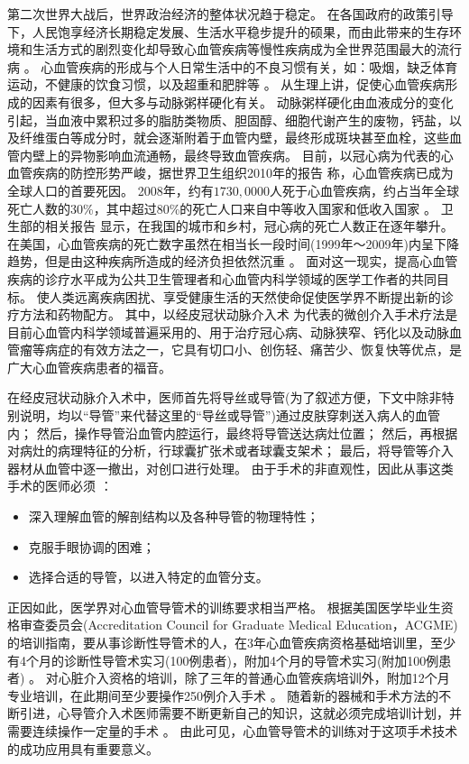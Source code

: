 第二次世界大战后，世界政治经济的整体状况趋于稳定。
在各国政府的政策引导下，人民饱享经济长期稳定发展、生活水平稳步提升的硕果，而由此带来的生存环境和生活方式的剧烈变化却导致心血管疾病等慢性疾病成为全世界范围最大的流行病 \cite{Hu2009}。%
心血管疾病的形成与个人日常生活中的不良习惯有关，如：吸烟，缺乏体育运动，不健康的饮食习惯，以及超重和肥胖等 \cite{Go2013}。
从生理上讲，促使心血管疾病形成的因素有很多，但大多与动脉粥样硬化有关。
动脉粥样硬化由血液成分的变化引起，当血液中累积过多的脂肪类物质、胆固醇、细胞代谢产生的废物，钙盐，以及纤维蛋白等成分时，就会逐渐附着于血管内壁，最终形成斑块甚至血栓，这些血管内壁上的异物影响血流通畅，最终导致血管疾病\cite{cvdaha}。
目前，以冠心病为代表的心血管疾病的防控形势严峻，据世界卫生组织2010年的报告 \cite{mho2011}称，心血管疾病已成为全球人口的首要死因。
2008年，约有$1730,0000$人死于心血管疾病，约占当年全球死亡人数的30\%，其中超过80\%的死亡人口来自中等收入国家和低收入国家 \cite{mho2011}。
卫生部的相关报告 \cite{moh2010annual,moh2007annual,moh2004annual}显示，在我国的城市和乡村，冠心病的死亡人数正在逐年攀升。
在美国，心血管疾病的死亡数字虽然在相当长一段时间(1999年～2009年)内呈下降趋势，但是由这种疾病所造成的经济负担依然沉重 \cite{Go2013}。
面对这一现实，提高心血管疾病的诊疗水平成为公共卫生管理者和心血管内科学领域的医学工作者的共同目标。
使人类远离疾病困扰、享受健康生活的天然使命促使医学界不断提出新的诊疗方法和药物配方。
其中，以经皮冠状动脉介入术 \cite{Baim2005}为代表的微创介入手术疗法是目前心血管内科学领域普遍采用的、用于治疗冠心病、动脉狭窄、钙化以及动脉血管瘤等病症的有效方法之一，它具有切口小、创伤轻、痛苦少、恢复快等优点，是广大心血管疾病患者的福音。%

在经皮冠状动脉介入术中，医师首先将导丝或导管(为了叙述方便，下文中除非特别说明，均以“导管”来代替这里的“导丝或导管”)通过皮肤穿刺送入病人的血管内；
然后，操作导管沿血管内腔运行，最终将导管送达病灶位置；
然后，再根据对病灶的病理特征的分析，行球囊扩张术或者球囊支架术；
最后，将导管等介入器材从血管中逐一撤出，对创口进行处理。
由于手术的非直观性，因此从事这类手术的医师必须 \cite{Li2012CUHK}：
\begin{itemize}
\item 深入理解血管的解剖结构以及各种导管的物理特性；
\item 克服手眼协调的困难；
\item 选择合适的导管，以进入特定的血管分支。
\end{itemize}
正因如此，医学界对心血管导管术的训练要求相当严格。
根据美国医学毕业生资格审查委员会(Accreditation Council for Graduate Medical Education，ACGME)的培训指南，要从事诊断性导管术的人，在3年心血管疾病资格基础培训里，至少有4个月的诊断性导管术实习(100例患者)，附加4个月的导管术实习(附加100例患者) \cite{Beller2002CardTraining}。%
对心脏介入资格的培训，除了三年的普通心血管疾病培训外，附加12个月专业培训，在此期间至少要操作250例介入手术 \cite{Beller2002CardTraining,Hirshfeld1999CardTraining}。
随着新的器械和手术方法的不断引进，心导管介入术医师需要不断更新自己的知识，这就必须完成培训计划，并需要连续操作一定量的手术 \cite{Baim2005}。
由此可见，心血管导管术的训练对于这项手术技术的成功应用具有重要意义。 